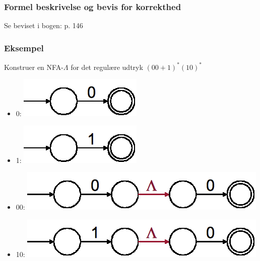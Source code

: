 \begin{frame}
\frametitle{Formel beskrivelse og bevis for korrekthed}
Se beviset i bogen: p. 146
\end{frame}

\begin{frame}
\frametitle{Eksempel}
Konstruer en NFA-$\Lambda$ for det regulære udtryk $(00+1)^*(10)^*$
\begin{itemize}[<+->]
\item 0:
  \includegraphics[scale=0.4]{images/2_seminar_kleene_1_ex_0}
\item 1:
  \includegraphics[scale=0.4]{images/2_seminar_kleene_1_ex_1}
\item 00:
  \includegraphics[scale=0.4]{images/2_seminar_kleene_1_ex_00}
\item 10:
  \includegraphics[scale=0.4]{images/2_seminar_kleene_1_ex_10}
\end{itemize}
\end{frame}
